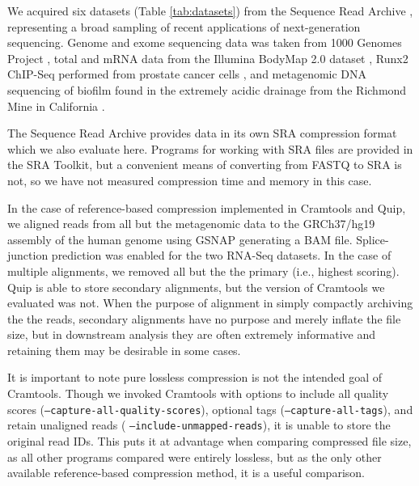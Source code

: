 \documentclass[a4,center,fleqn]{NAR}
\begin{document}
We acquired six datasets (Table \ref{tab:datasets}) from the Sequence Read
Archive \citep{Leinonen2011}, representing a broad sampling of recent
applications of next-generation sequencing. Genome and exome sequencing data was
taken from 1000 Genomes Project
\citep{The1000GenomesConsortium2010},
total and mRNA data from the Illumina BodyMap
2.0 dataset \citep{Asmann2012},
Runx2 ChIP-Seq performed from prostate cancer cells
\citep{Little2011}, and metagenomic DNA sequencing of biofilm found in the extremely acidic
drainage from the Richmond Mine in California
\citep{Denef2010}.

The Sequence Read Archive provides data in its own SRA compression format
which we also evaluate here. Programs for working with SRA files are provided
in the SRA Toolkit, but a convenient means of converting from FASTQ to SRA is
not, so we have not measured compression time and memory in this case.


In the case of reference-based compression implemented in Cramtools and Quip, we
aligned reads from all but the metagenomic data to the GRCh37/hg19 assembly of
the human genome using GSNAP \citep{Wu2010} generating a BAM file.
Splice-junction prediction was enabled for the two RNA-Seq datasets. In the case of
multiple alignments, we removed all but the the primary (i.e., highest
scoring). Quip is able to store secondary alignments, but the version of
Cramtools we evaluated was not. When the purpose of alignment in simply
compactly archiving the the reads, secondary alignments have no purpose and
merely inflate the file size, but in downstream analysis they are often
extremely informative and retaining them may be desirable in some cases.


It is important to note pure lossless compression is not the intended goal of
Cramtools. Though we invoked Cramtools with options to include all quality
scores (\texttt{--capture-all-quality-scores}), optional tags (\texttt
{--capture-all-tags}), and retain unaligned reads (
\texttt{--include-unmapped-reads}), it is unable to store the original read IDs. This puts it at
advantage when comparing compressed file size, as all other programs compared
were entirely lossless, but as the only other available reference-based
compression method, it is a useful comparison.

\end{document}
